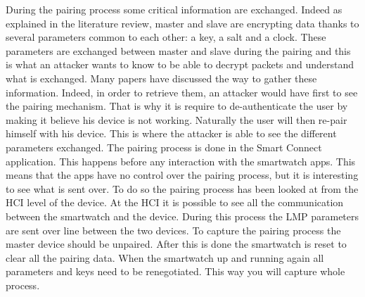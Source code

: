 During the pairing process some critical information are exchanged. Indeed as explained in the literature review, master and slave are encrypting data thanks to several parameters common to each other: a key, a salt and a clock. These parameters are exchanged between master and slave during the pairing and this is what an attacker wants to know to be able to decrypt packets and understand what is exchanged. \pend
Many papers have discussed the way to gather these information. Indeed, in order to retrieve them, an attacker would have first to see the pairing mechanism. That is why it is require to de-authenticate the user by making it believe his device is not working. Naturally the user will then re-pair himself with his device. This is where the attacker is able to see the different parameters exchanged. \pend
The pairing process is done in the Smart Connect application. This happens before any interaction with the smartwatch apps. This means that the apps have no control over the pairing process, but it is interesting to see what is sent over. 
To do so the pairing process has been looked at from the HCI level of the device. At the HCI it is possible to see all the communication between the smartwatch and the device. During this process the LMP parameters are sent over line between the two devices. \pend
To capture the pairing process the master device should be unpaired. After this is done the smartwatch is reset to clear all the pairing data. When the smartwatch up and running again all parameters and keys need to be renegotiated. This way you will capture whole process.
